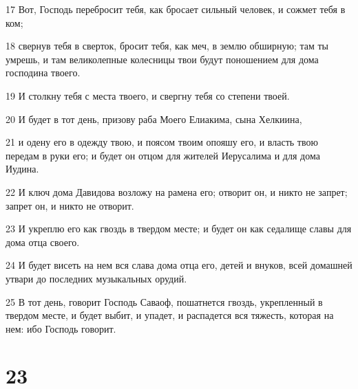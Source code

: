 \par 17 Вот, Господь перебросит тебя, как бросает сильный человек, и сожмет тебя в ком;
\par 18 свернув тебя в сверток, бросит тебя, как меч, в землю обширную; там ты умрешь, и там великолепные колесницы твои будут поношением для дома господина твоего.
\par 19 И столкну тебя с места твоего, и свергну тебя со степени твоей.
\par 20 И будет в тот день, призову раба Моего Елиакима, сына Хелкиина,
\par 21 и одену его в одежду твою, и поясом твоим опояшу его, и власть твою передам в руки его; и будет он отцом для жителей Иерусалима и для дома Иудина.
\par 22 И ключ дома Давидова возложу на рамена его; отворит он, и никто не запрет; запрет он, и никто не отворит.
\par 23 И укреплю его как гвоздь в твердом месте; и будет он как седалище славы для дома отца своего.
\par 24 И будет висеть на нем вся слава дома отца его, детей и внуков, всей домашней утвари до последних музыкальных орудий.
\par 25 В тот день, говорит Господь Саваоф, пошатнется гвоздь, укрепленный в твердом месте, и будет выбит, и упадет, и распадется вся тяжесть, которая на нем: ибо Господь говорит.

\chapter{23}


